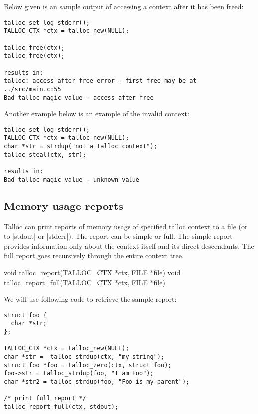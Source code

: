 Below given is an sample output of accessing a context after it has been freed:

\begin{lstlisting}[caption={Talloc error -- access after free}]
talloc_set_log_stderr();
TALLOC_CTX *ctx = talloc_new(NULL);

talloc_free(ctx);
talloc_free(ctx);

results in:
talloc: access after free error - first free may be at ../src/main.c:55
Bad talloc magic value - access after free
\end{lstlisting}

\noindent
Another example below is an example of the invalid context:

\begin{lstlisting}[caption={Talloc error -- not a talloc context}]
talloc_set_log_stderr();
TALLOC_CTX *ctx = talloc_new(NULL);
char *str = strdup("not a talloc context");
talloc_steal(ctx, str);

results in:
Bad talloc magic value - unknown value
\end{lstlisting}

\subsection{Memory usage reports}

Talloc can print reports of memory usage of specified talloc context to a file
(or to |stdout| or |stderr|). The report can be simple or full. The simple
report provides information only about the context itself and its direct
descendants. The full report goes recursively through the entire context tree.

\begin{funcproto}
void talloc_report(TALLOC_CTX *ctx, FILE *file)
void talloc_report_full(TALLOC_CTX *ctx, FILE *file)
\end{funcproto}
\funclistend
We will use following code to retrieve the sample report:

\begin{lstlisting}[caption={Full report}]
struct foo {
  char *str;
};

TALLOC_CTX *ctx = talloc_new(NULL);
char *str =  talloc_strdup(ctx, "my string");
struct foo *foo = talloc_zero(ctx, struct foo);
foo->str = talloc_strdup(foo, "I am Foo");
char *str2 = talloc_strdup(foo, "Foo is my parent");

/* print full report */
talloc_report_full(ctx, stdout);
\end{lstlisting}

